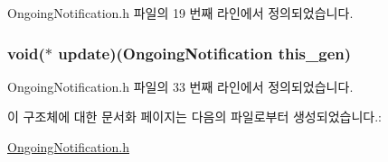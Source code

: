 Ongoing\-Notification.\-h 파일의 19 번째 라인에서 정의되었습니다.

\hypertarget{struct___ongoing_notification_ae5eaf248602ec0edb1334d47d959f0e9}{
\subsubsection[{update}]{\setlength{\rightskip}{0pt plus 5cm}void($\ast$  update)({\bf Ongoing\-Notification} this\-\_\-gen)}}\label{struct___ongoing_notification_ae5eaf248602ec0edb1334d47d959f0e9}


Ongoing\-Notification.\-h 파일의 33 번째 라인에서 정의되었습니다.



이 구조체에 대한 문서화 페이지는 다음의 파일로부터 생성되었습니다.\-:\begin{DoxyCompactItemize}
\item 
\hyperlink{_ongoing_notification_8h}{Ongoing\-Notification.\-h}\end{DoxyCompactItemize}
